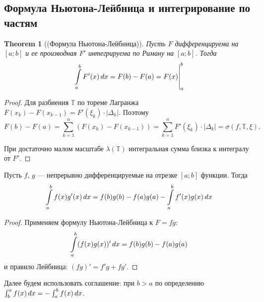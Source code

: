 \documentclass[a4paper]{article}
\theoremstyle{named}
\newtheorem*{namedtheorem}{Theorem}
\newcommand{\T}{\mathbb{T}}
\renewcommand{\int}{\intop}
\begin{document}
        \subsection{Формула Ньютона-Лейбница и интегрирование по частям}

        \begin{namedtheorem}[(Формула Ньютона-Лейбница)]
            Пусть $F$ дифференцируема на $[a; b]$ и ее производная $F'$ интегрируема по Риману на $[a; b]$. Тогда
            \begin{equation*}
                \left. \int_a^b F'(x) \dd x = F(b) - F(a) = F(x) \right|_a^b
            \end{equation*}
        \end{namedtheorem}

        \begin{proof}
            Для разбиения $\T$ по тореме Лагранжа $F(x_k) - F(x_{k - 1}) = F'(\xi_k) \cdot |\Delta_k|$. Поэтому
            \begin{equation*}
                F(b) - F(a) = \sum_{k = 1}^n (F(x_k) - F(x_{k - 1})) = \sum_{k = 1}^n F'(\xi_k) \cdot |\Delta_k| = \sigma(f, \T, \xi).
            \end{equation*}

            При достаточно малом масштабе $\lambda(\T)$ интегральная сумма близка к интегралу от $F'$.
        \end{proof}

        \begin{consequence*}
            Пусть $f$, $g$ --- непрерывно дифференцируемые на отрезке $[a; b]$ функции. Тогда
            \begin{equation*}
                \int_a^b f(x) g'(x) \dd x = f(b) g(b) - f(a) g(a) - \int_a^b f'(x) g(x) \dd x
            \end{equation*}
        \end{consequence*}

        \begin{proof}
            Применяем формулу Ньютона-Лейбница к $F = fg$:
            \begin{equation*}
                \int_a^b (f(x)g(x))' \dd x = f(b)g(b) - f(a)g(a)
            \end{equation*}
            и правило Лейбница: $(fg)' = f'g + fg'$.
        \end{proof}

        Далее будем использовать соглашение: при $b > a$ по определению $\int_b^a f(x) \dd x = - \int_a^b f(x) \dd x$.
\end{document}
